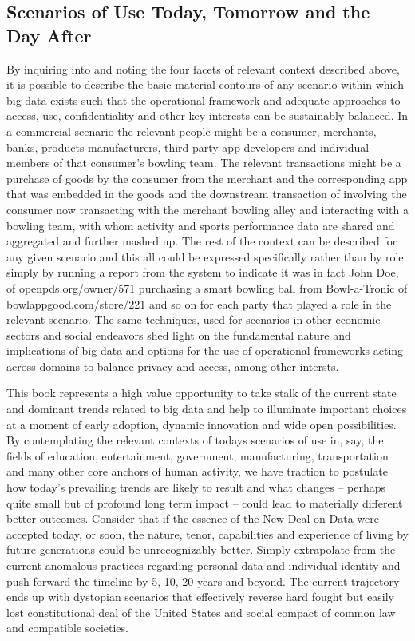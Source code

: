 \subsection{Scenarios of Use Today, Tomorrow and the Day After}

By inquiring into and noting the four facets of relevant context described above, it is possible to describe the basic material contours of any scenario within which big data exists such that the operational framework and adequate approaches to access, use, confidentiality and other key interests can be sustainably balanced. In a commercial scenario the relevant people might be a consumer, merchants, banks, products manufacturers, third party app developers and individual members of that consumer’s bowling team. The relevant transactions might be a purchase of goods by the consumer from the merchant and the corresponding app that was embedded in the goods and the downstream transaction of involving the consumer now transacting with the merchant bowling alley and interacting with a bowling team, with whom activity and sports performance data are shared and aggregated and further mashed up. The rest of the context can be described for any given scenario and this all could be expressed specifically rather than by role simply by running a report from the system to indicate it was in fact John Doe, of openpds.org/owner/571 purchasing a smart bowling ball from Bowl-a-Tronic of bowlappgood.com/store/221 and so on for each party that played a role in the relevant scenario. The same techniques, used for scenarios in other economic sectors and social endeavors shed light on the fundamental nature and implications of big data and options for the use of operational frameworks acting across domains to balance privacy and access, among other intersts.

This book represents a high value opportunity to take stalk of the current state and dominant trends related to big data and help to illuminate important choices at a moment of early adoption, dynamic innovation and wide open possibilities. By contemplating the relevant contexts of todays scenarios of use in, say, the fields of education, entertainment, government, manufacturing, transportation and many other core anchors of human activity, we have traction to postulate how today’s prevailing trends are likely to result and what changes – perhaps quite small but of profound long term impact – could lead to materially different better outcomes. Consider that if the essence of the New Deal on Data were accepted today, or soon, the nature, tenor, capabilities and experience of living by future generations could be unrecognizably better. Simply extrapolate from the current anomalous practices regarding personal data and individual identity and push forward the timeline by 5, 10, 20 years and beyond. The current trajectory ends up with dystopian scenarios that effectively reverse hard fought but easily lost constitutional deal of the United States and social compact of common law and compatible societies.

